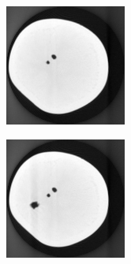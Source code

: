 \documentclass[journal]{IEEEtran}
\begin{document}
\begin{figure}[!h]
\begin{subfigure}[b]{0.24\linewidth}
        \includegraphics[width=\textwidth]{../images/potato/template_2.png}
\captionsetup{labelformat=empty}
        \caption{}
     \end{subfigure}
    \begin{subfigure}[b]{0.24\linewidth}
        \includegraphics[width=\textwidth]{../images/potato/template_3.png}

\end{subfigure}
\end{figure}
\end{document}
